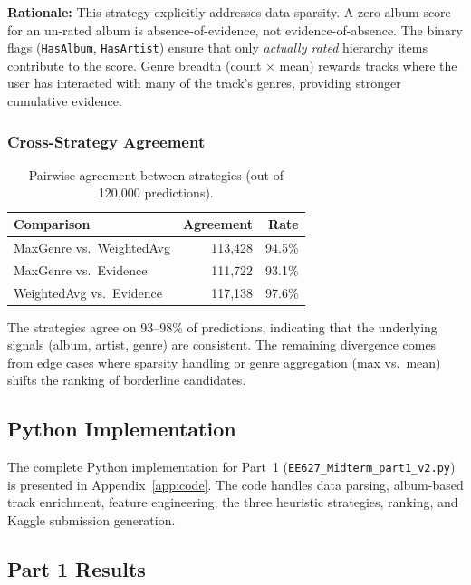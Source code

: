 \documentclass[12pt]{article}
\begin{document}
\textbf{Rationale:} This strategy explicitly addresses data sparsity. A zero album score for an un-rated album is absence-of-evidence, not evidence-of-absence. The binary flags (\texttt{HasAlbum}, \texttt{HasArtist}) ensure that only \emph{actually rated} hierarchy items contribute to the score. Genre breadth (count $\times$ mean) rewards tracks where the user has interacted with many of the track's genres, providing stronger cumulative evidence.

\subsubsection{Cross-Strategy Agreement}

\begin{table}[H]
	\centering
	\begin{tabular}{lrr}
		\toprule
		\textbf{Comparison} & \textbf{Agreement} & \textbf{Rate} \\
		\midrule
		MaxGenre vs.\ WeightedAvg    & 113,428 & 94.5\% \\
		MaxGenre vs.\ Evidence       & 111,722 & 93.1\% \\
		WeightedAvg vs.\ Evidence    & 117,138 & 97.6\% \\
		\bottomrule
	\end{tabular}
	\caption{Pairwise agreement between strategies (out of 120,000 predictions).}\label{tab:agreement}
\end{table}

The strategies agree on 93--98\% of predictions, indicating that the underlying signals (album, artist, genre) are consistent. The remaining divergence comes from edge cases where sparsity handling or genre aggregation (max vs.\ mean) shifts the ranking of borderline candidates.

\subsection{Python Implementation}

The complete Python implementation for Part~1 (\texttt{EE627\_Midterm\_part1\_v2.py}) is presented in Appendix~\ref{app:code}. The code handles data parsing, album-based track enrichment, feature engineering, the three heuristic strategies, ranking, and Kaggle submission generation.

\newpage
\subsection{Part 1 Results}
\end{document}
